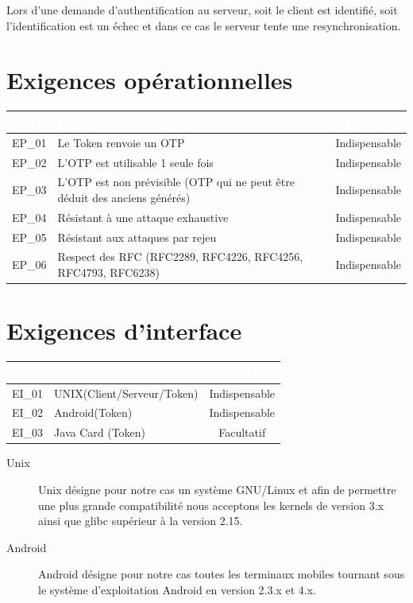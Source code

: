 \documentclass{"../../res/univ-projet"}
\begin{document}
Lors d'une demande d'authentification au serveur, soit le client est identifié, soit l'identification est un échec et dans ce cas
le serveur tente une resynchronisation.
\clearpage
\newpage
\section{Exigences opérationnelles}
\begin{tabular}{|c|l|c|}
    \hline
    \rowcolor{gray}
    \textcolor{white}{Id} & \textcolor{white}{Intitulé} & \textcolor{white}{Priorité}\\
    \hline
    EP\_01 & Le Token renvoie un OTP & Indispensable\\
    \hline
    EP\_02 & L'OTP est utilisable 1 seule fois & Indispensable\\
    \hline
    EP\_03 & L'OTP est non prévisible (OTP qui ne peut être déduit des anciens générés) & Indispensable\\
    \hline
    EP\_04 & Résistant à une attaque exhaustive & Indispensable\\
    \hline
    EP\_05 & Résistant aux attaques par rejeu & Indispensable\\
    EP\_06 & Respect des RFC (RFC2289, RFC4226, RFC4256, RFC4793, RFC6238) & Indispensable\\
    \hline
    \hline
    
    
\end{tabular}

\section{Exigences d'interface}
\begin{tabular}{|c|l|c|}
    \hline
    \rowcolor{gray}
    \textcolor{white}{Id} & \textcolor{white}{Intitulé} & \textcolor{white}{Priorité}\\
    \hline
    EI\_01 & UNIX(Client/Serveur/Token) & Indispensable\\
    \hline
    EI\_02 & Android(Token) & Indispensable\\
    \hline
    EI\_03 & Java Card (Token) & Facultatif\\
    \hline
\end{tabular}
\vspace{0.5cm}
\begin{description}
 \item[Unix] Unix désigne pour notre cas un système GNU/Linux et afin de permettre une plus grande compatibilité
 nous acceptons les kernels de version 3.x ainsi que glibc supérieur à la version 2.15.
 \item[Android] Android désigne pour notre cas toutes les terminaux mobiles tournant sous le système d'exploitation Android en version 2.3.x et 4.x.
\end{description}
\end{document}
